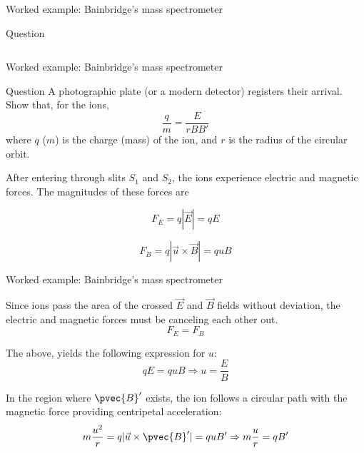 {\begin{frame}{Worked example: Bainbridge's mass spectrometer}
\begin{blockexmplque}{Question}
\begin{columns}
\begin{column}{0.40\textwidth}
\begin{center}
        \end{center}
      \end{column}
    \end{columns}
  \end{blockexmplque}

\end{frame}

%
%
%

\begin{frame}{Worked example: Bainbridge's mass spectrometer}

  \begin{blockexmplque}{Question}
    A photographic plate (or a modern detector) registers their arrival.
    Show that, for the ions,
    \begin{equation*}
      \frac{q}{m} = \frac{E}{rBB'}
    \end{equation*}
    where $q$ ($m$) is the charge (mass) of the ion,
    and $r$ is the radius of the circular orbit.
  \end{blockexmplque}

  After entering through slits $S_1$ and $S_2$, the ions experience
  electric and magnetic forces.
  The magnitudes of these forces are

  \begin{equation*}
    {F}_{E} = q |\vec{E}| = q E
  \end{equation*}

  \begin{equation*}
    {F}_{B} = q|\vec{u} \times \vec{B}| = q u B
  \end{equation*}

\end{frame}

%
%
%

\begin{frame}{Worked example: Bainbridge's mass spectrometer}

  Since ions pass the area of the crossed $\vec{E}$ and $\vec{B}$ fields
  without deviation, the electric and magnetic forces must be canceling
  each other out.
  \begin{equation*}
    {F}_{E} = {F}_{B}
  \end{equation*}

  The above, yields the following expression for $u$:
  \begin{equation*}
    q E = q u B \Rightarrow u = \frac{E}{B}
  \end{equation*}

  In the region where $\pvec{B}'$ exists, the ion follows a circular path
  with the magnetic force providing centripetal acceleration:
  \begin{equation*}
    m \frac{u^2}{r} = q |\vec{u} \times \pvec{B}'| = q u B' \Rightarrow
    m \frac{u}{r} = q B'
  \end{equation*}


\end{frame}}
